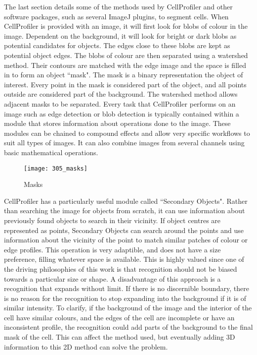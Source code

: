 The last section details some of the methods used by CellProfiler and other software packages, such as several ImageJ plugins, to segment cells. When CellProfiler is provided with an image, it will first look for blobs of colour in the image. Dependent on the background, it will look for bright or dark blobs as potential candidates for objects. The edges close to these blobs are kept as potential object edges. The blobs of colour are then separated using a watershed method. Their contours are matched with the edge image and the space is filled in to form an object ``mask". The mask is a binary representation the object of interest. Every point in the mask is considered part of the object, and all points outside are considered part of the background. The watershed method allows adjacent masks to be separated. Every task that CellProfiler performs on an image such as edge detection or blob detection is typically contained within a module that stores information about operations done to the image. These modules can be chained to compound effects and allow very specific workflows to suit all types of images. It can also combine images from several channels using basic mathematical operations.

\begin{figure}[p]
 \centering
 \texttt{[image: 305\_masks]}
 \caption{
 	Masks
 }
 \label{fig:masks}
\end{figure}

CellProfiler has a particularly useful module called ``Secondary Objects". Rather than searching the image for objects from scratch, it can use information about previously found objects to search in their vicinity. If object centres are represented as points, Secondary Objects can search around the points and use information about the vicinity of the point to match similar patches of colour or edge profiles. This operation is very adaptible, and does not have a size preference, filling whatever space is available. This is highly valued since one of the driving philosophies of this work is that recognition should not be biased towards a particular size or shape. A disadvantage of this approach is a recognition that expands without limit. If there is no discernible boundary, there is no reason for the recognition to stop expanding into the background if it is of similar intensity. To clarify, if the background of the image and the interior of the cell have similar colours, and the edges of the cell are incomplete or have an inconsistent profile, the recognition could add parts of the background to the final mask of the cell. This can affect the method used, but eventually adding 3D information to this 2D method can solve the problem.

